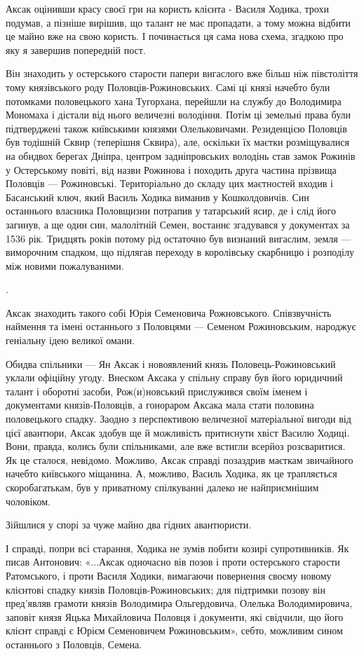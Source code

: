 Аксак оцінивши красу своєї гри на користь клієнта - Василя Ходика, трохи
подумав, а пізніше вирішив, що талант не має пропадати, а тому можна відбити це
майно вже на свою користь. І починається ця сама нова схема, згадкою про яку я
завершив попередній пост.

Він знаходить у остерського старости папери вигаслого вже більш ніж півстоліття
тому князівського роду Половців-Рожиновських. Самі ці князі начебто були
потомками половецького хана Тугорхана, перейшли на службу до Володимира
Мономаха і дістали від нього величезні володіння. Потім ці земельні права були
підтверджені також київськими князями Олельковичами. Резиденцією Половців був
тодішній Сквир (теперішня Сквира), але, оскільки їх маєтки розміщувалися на
обидвох берегах Дніпра, центром задніпровських володінь став замок Рожинів у
Остерському повіті, від назви Рожинова і походить друга частина прізвища
Половців — Рожиновські. Територіально до складу цих маєтностей входив і
Басанський ключ, який Василь Ходика виманив у Кошколдовичів. Син останнього
власника Половщизни потрапив у татарський ясир, де і слід його загинув, а ще
один син, малолітній Семен, востаннє згадувався у документах за 1536 рік.
Тридцять років потому рід остаточно був визнаний вигаслим, земля — виморочним
спадком, що підлягав переходу в королівську скарбницю і розподілу між новими
пожалуваними. 

.

Аксак знаходить такого собі Юрія Семеновича Рожновського. Співзвучність
наймення та імені останнього з Половцями — Семеном Рожиновським, народжує
геніальну ідею великої омани. 

Обидва спільники — Ян Аксак і новоявлений князь Половець-Рожиновський уклали
офіційну угоду. Внеском Аксака у спільну справу був його юридичний талант і
оборотні засоби, Рож(и)новський прислужився своїм іменем і документами
князів-Половців, а гонораром Аксака мала стати половина половецького спадку.
Заодно з перспективою величезної матеріальної вигоди від цієї авантюри, Аксак
здобув ще й можливість притиснути хвіст Василю Ходиці. Вони, правда, колись
були спільниками, але вже встигли всерйоз розсваритися. Як це сталося,
невідомо. Можливо, Аксак справді позаздрив маєткам звичайного начебто
київського міщанина. А, можливо, Василь Ходика, як це трапляється
скоробагатькам, був у приватному спілкуванні далеко не найприємнішим чоловіком.

Зійшлися у спорі за чуже майно два гідних авантюристи. 

І справді, попри всі старання, Ходика не зумів побити козирі супротивників. Як
писав Антонович: «...Аксак одночасно вів позов і проти остерського старости
Ратомського, і проти Василя Ходики, вимагаючи повернення своєму новому
клієнтові спадку князів Половців-Рожиновських; для підтримки позову він
пред’являв грамоти князів Володимира Ольгердовича, Олелька Володимировича,
заповіт князя Яцька Михайловича Половця і документи, які свідчили, що його
клієнт справді є Юрієм Семеновичем Рожиновським», себто, можливим сином
останнього з Половців, Семена. 

